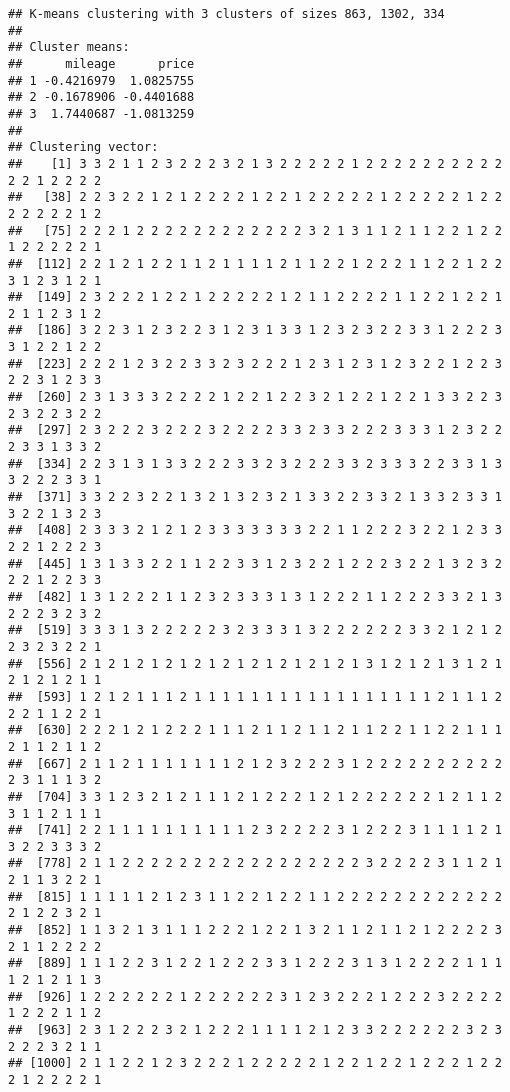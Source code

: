 \documentclass[
]{article}
\begin{document}
\begin{verbatim}
## K-means clustering with 3 clusters of sizes 863, 1302, 334
## 
## Cluster means:
##      mileage      price
## 1 -0.4216979  1.0825755
## 2 -0.1678906 -0.4401688
## 3  1.7440687 -1.0813259
## 
## Clustering vector:
##    [1] 3 3 2 1 1 2 3 2 2 2 3 2 1 3 2 2 2 2 2 1 2 2 2 2 2 2 2 2 2 2 2 2 1 2 2 2 2
##   [38] 2 2 3 2 2 1 2 1 2 2 2 2 1 2 2 1 2 2 2 2 2 1 2 2 2 2 2 1 2 2 2 2 2 2 2 1 2
##   [75] 2 2 2 1 2 2 2 2 2 2 2 2 2 2 2 2 3 2 1 3 1 1 2 1 1 2 2 1 2 2 1 2 2 2 2 2 1
##  [112] 2 2 1 2 1 2 2 1 1 2 1 1 1 1 2 1 1 2 2 1 2 2 2 1 1 2 2 1 2 2 3 1 2 3 1 2 1
##  [149] 2 3 2 2 2 1 2 2 1 2 2 2 2 2 1 2 1 1 2 2 2 2 1 1 2 2 1 2 2 1 2 1 1 2 3 1 2
##  [186] 3 2 2 3 1 2 3 2 2 3 1 2 3 1 3 3 1 2 3 2 3 2 2 3 3 1 2 2 2 3 3 1 2 2 1 2 2
##  [223] 2 2 2 1 2 3 2 2 3 3 2 3 2 2 2 1 2 3 1 2 3 1 2 3 2 2 1 2 2 3 2 2 3 1 2 3 3
##  [260] 2 3 1 3 3 3 2 2 2 2 1 2 2 1 2 2 3 2 1 2 2 1 2 2 1 3 3 2 2 3 2 3 2 2 3 2 2
##  [297] 2 3 2 2 2 3 2 2 2 3 2 2 2 2 3 3 2 3 3 2 2 2 3 3 3 1 2 3 2 2 2 3 3 1 3 3 2
##  [334] 2 2 3 1 3 1 3 3 2 2 2 3 3 2 3 2 2 2 3 3 2 3 3 3 2 2 3 3 1 3 3 2 2 2 3 3 1
##  [371] 3 3 2 2 3 2 2 1 3 2 1 3 2 3 2 1 3 3 2 2 3 3 2 1 3 3 2 3 3 1 3 2 2 1 3 2 3
##  [408] 2 3 3 3 2 1 2 1 2 3 3 3 3 3 3 3 2 2 1 1 2 2 2 3 2 2 1 2 3 3 2 2 1 2 2 2 3
##  [445] 1 3 1 3 3 2 2 1 1 2 2 3 3 1 2 3 2 2 1 2 2 2 3 2 2 1 3 2 3 2 2 2 1 2 2 3 3
##  [482] 1 3 1 2 2 2 1 1 2 3 2 3 3 3 1 3 1 2 2 2 1 1 2 2 2 3 3 2 1 3 2 2 2 3 2 3 2
##  [519] 3 3 3 1 3 2 2 2 2 2 3 2 3 3 3 1 3 2 2 2 2 2 2 3 3 2 1 2 1 2 2 3 2 3 2 2 1
##  [556] 2 1 2 1 2 1 2 1 2 1 2 1 2 1 2 1 2 1 2 1 3 1 2 1 2 1 3 1 2 1 2 1 2 1 2 1 1
##  [593] 1 2 1 2 1 1 1 2 1 1 1 1 1 1 1 1 1 1 1 1 1 1 1 1 1 2 1 1 1 2 2 2 1 1 2 2 1
##  [630] 2 2 2 1 2 1 2 2 2 1 1 1 2 1 1 2 1 1 2 1 1 2 2 1 1 2 2 1 1 1 2 1 1 2 1 1 2
##  [667] 2 1 1 2 1 1 1 1 1 1 1 2 1 2 3 2 2 2 3 1 2 2 2 2 2 2 2 2 2 2 2 3 1 1 1 3 2
##  [704] 3 3 1 2 3 2 1 2 1 1 1 2 1 2 2 2 1 2 1 2 2 2 2 2 2 1 2 1 1 2 3 1 1 2 1 1 1
##  [741] 2 2 1 1 1 1 1 1 1 1 1 1 2 3 2 2 2 2 3 1 2 2 2 3 1 1 1 1 2 1 3 2 2 3 3 3 2
##  [778] 2 1 1 2 2 2 2 2 2 2 2 2 2 2 2 2 2 2 2 2 3 2 2 2 2 3 1 1 2 1 2 1 1 3 2 2 1
##  [815] 1 1 1 1 1 2 1 2 3 1 1 2 2 1 2 2 1 1 2 2 2 2 2 2 2 2 2 2 2 2 2 1 2 2 3 2 1
##  [852] 1 1 3 2 1 3 1 1 1 2 2 2 1 2 2 1 3 2 1 1 2 1 1 2 1 2 2 2 2 3 2 1 1 2 2 2 2
##  [889] 1 1 1 2 2 3 1 2 2 1 2 2 2 3 3 1 2 2 2 3 1 3 1 2 2 2 2 1 1 1 1 2 1 2 1 1 3
##  [926] 1 2 2 2 2 2 2 1 2 2 2 2 2 2 3 1 2 3 2 2 2 1 2 2 2 3 2 2 2 2 1 2 2 2 1 1 2
##  [963] 2 3 1 2 2 2 3 2 1 2 2 2 1 1 1 1 2 1 2 3 3 2 2 2 2 2 2 3 2 3 2 2 2 3 2 1 1
## [1000] 2 1 1 2 2 1 2 3 2 2 2 1 2 2 2 2 2 1 2 2 1 2 2 1 2 2 2 1 2 2 2 1 2 2 2 2 1

\end{verbatim}
\end{document}
